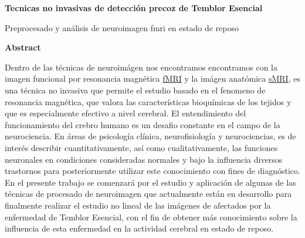 \thispagestyle{plain}
\begin{center}
    \Large
    \textbf{Tecnicas no invasivas de detección precoz de Temblor Esencial}
    
    \vspace{0.4cm}
    \large
    Preprocesado y análisis de neuroimagen fmri en estado de reposo
    
    \vspace{0.9cm}
    \textbf{Abstract}
\end{center}

Dentro de las técnicas de neuroimágen nos encontramos encontramos con la imagen funcional por resonancia magnética \hyperref[glos:fmri]{fMRI} y la imágen anatómica \hyperref[glos:smri]{sMRI}, es una técnica no invasiva que permite el estudio basado en el fenomeno de resonancia magnética, que valora las características bioquímicas de los tejidos y que es especialmente efectivo a nivel cerebral. 
El entendimiento del funcionamiento del crebro humano es un desafio constante en el campo de la neurociencia. 
En áreas de psicología clínica, neurofisiología y neurociencias, es de interés describir cuantitativamente, así como cualitativamente, las funciones neuronales en condiciones consideradas normales y bajo la influencia diversos trastornos para posteriormente utilizar este conocimiento con fines de diagnóstico.
En el presente trabajo se comenzará por el estudio y aplicación de algunas de las técnicas de procesado de neuroimagen que actualmente están en desarrollo para finalmente realizar el estudio no lineal de las imágenes de afectados por la enfermedad de Temblor Esencial, con el fin de obtener más conocimiento sobre la influencia de esta enfermedad en la actividad cerebral en estado de reposo.  